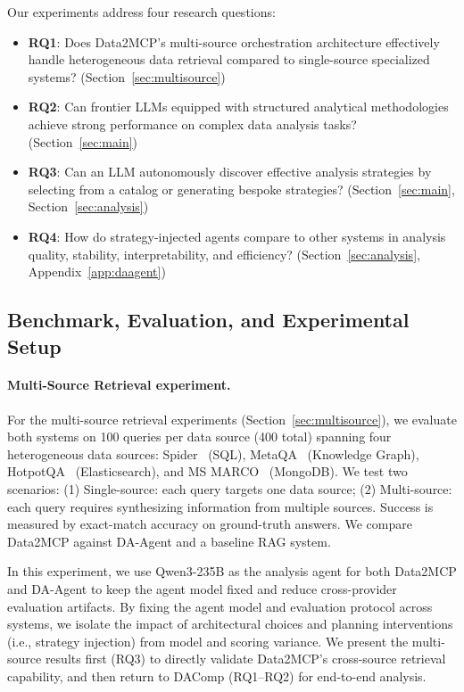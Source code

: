 Our experiments address four research questions:

\begin{itemize}
  \item \textbf{RQ1}: Does Data2MCP's multi-source orchestration architecture
    effectively handle heterogeneous data retrieval compared to single-source
    specialized systems?
    (Section~\ref{sec:multisource})
  \item \textbf{RQ2}: Can frontier LLMs equipped with structured analytical
    methodologies achieve strong performance on complex data analysis tasks?
    (Section~\ref{sec:main})
  \item \textbf{RQ3}: Can an LLM autonomously discover effective analysis
    strategies by selecting from a catalog or generating bespoke strategies?
    (Section~\ref{sec:main}, Section~\ref{sec:analysis})
  \item \textbf{RQ4}: How do strategy-injected agents compare to other systems
    in analysis quality, stability, interpretability, and efficiency?
    (Section~\ref{sec:analysis}, Appendix~\ref{app:daagent})
\end{itemize}

\subsection{Benchmark, Evaluation, and Experimental Setup}

\paragraph{Multi-Source Retrieval experiment.}
For the multi-source retrieval experiments (Section~\ref{sec:multisource}), we evaluate both systems on 100 queries per data source (400 total) spanning four heterogeneous data sources: Spider~\cite{spider2018} (SQL), MetaQA~\cite{metaqa2018} (Knowledge Graph), HotpotQA~\cite{hotpotqa2018} (Elasticsearch), and MS MARCO~\cite{msmarco2016} (MongoDB). We test two scenarios: (1) Single-source: each query targets one data source; (2) Multi-source: each query requires synthesizing information from multiple sources. Success is measured by exact-match accuracy on ground-truth answers. We compare Data2MCP against DA-Agent and a baseline RAG system.

In this experiment, we use Qwen3-235B as the analysis agent for both Data2MCP and DA-Agent to keep the agent model fixed and reduce cross-provider evaluation artifacts. By fixing the agent model and evaluation protocol across systems, we isolate the impact of architectural choices and planning interventions (i.e., strategy injection) from model and scoring variance. We present the multi-source results first (RQ3) to directly validate Data2MCP's cross-source retrieval capability, and then return to DAComp (RQ1--RQ2) for end-to-end analysis.

